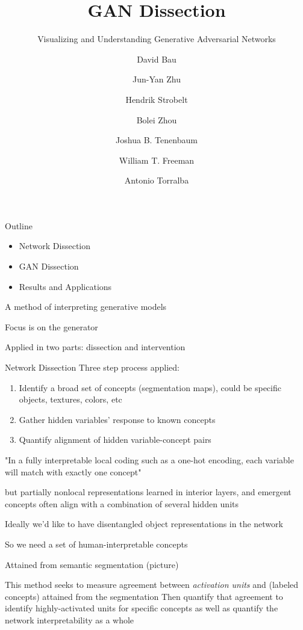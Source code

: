 \documentclass{beamer}
\title %
{GAN Dissection}
\subtitle{Visualizing and Understanding Generative Adversarial Networks}
\author[Arthur, Doe] %
{David Bau\inst{1}\inst{2} \and Jun-Yan Zhu\inst{1} \and Hendrik Strobelt\inst{2}\inst{3} \and Bolei Zhou\inst{4} \and Joshua B. Tenenbaum\inst{1} \and William T. Freeman\inst{1} \and Antonio Torralba\inst{1}\inst{2}}
\institute[VFU] %
{
  \inst{1}%
  Massachusetts Institute of Technology
  \and
  \inst{2}%
  MIT-IBM Watson AI Lab
  \and
  \inst{3}%
  IBM Research
  \and
  \inst{4}%
  The Chinese University of Hong Kong
}
\date{}
\begin{document}
\frame{\titlepage}

\begin{frame}{Outline}
\begin{itemize}
\item Network Dissection
\item GAN Dissection
\item Results and Applications
\end{itemize}
\end{frame}

\begin{frame}
A method of interpreting generative models

Focus is on the generator

Applied in two parts: dissection and intervention
\end{frame}

\begin{frame}{Network Dissection}
Three step process applied:
\begin{enumerate}
\item Identify a broad set of concepts (segmentation maps), could be specific objects, textures, colors, etc
\item Gather hidden variables' response to known concepts
\item Quantify alignment of hidden variable-concept pairs
\end{enumerate}
\end{frame}

\begin{frame}
"In a fully interpretable local coding such as a one-hot encoding, each variable will match with exactly one concept"

but partially nonlocal representations learned in interior layers, and emergent concepts often align with a combination of several hidden units

Ideally we'd like to have disentangled object representations in the network
\end{frame}

\begin{frame}
So we need a set of human-interpretable concepts

Attained from semantic segmentation (picture)

This method seeks to measure agreement between \emph{activation units} and (labeled concepts) attained from the segmentation
Then quantify that agreement to identify highly-activated units for specific concepts as well as quantify the network interpretability as a whole
\end{frame}
\end{document}

